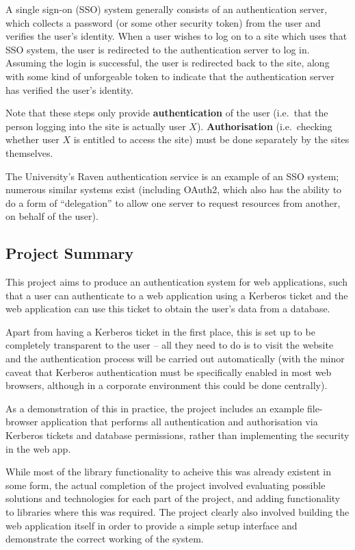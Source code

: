 \documentclass{article}
\begin{document}
A single sign-on (SSO) system generally consists of an authentication server, which collects a password (or some other security token) from the user and verifies the user's identity. When a user wishes to log on to a site which uses that SSO system, the user is redirected to the authentication server to log in. Assuming the login is successful, the user is redirected back to the site, along with some kind of unforgeable token to indicate that the authentication server has verified the user's identity.

Note that these steps only provide \textbf{authentication} of the user (i.e.\ that the person logging into the site is actually user $X$). \textbf{Authorisation} (i.e.\ checking whether user $X$ is entitled to access the site) must be done separately by the sites themselves.

The University's Raven authentication service is an example of an SSO system; numerous similar systems exist (including OAuth2, which also has the ability to do a form of ``delegation'' to allow one server to request resources from another, on behalf of the user\cite{Oracle-OAuth2}).

\subsection{Project Summary}
This project aims to produce an authentication system for web applications, such that a user can authenticate to a web application using a Kerberos ticket and the web application can use this ticket to obtain the user's data from a database.

Apart from having a Kerberos ticket in the first place, this is set up to be completely transparent to the user -- all they need to do is to visit the website and the authentication process will be carried out automatically (with the minor caveat that Kerberos authentication must be specifically enabled in most web browsers, although in a corporate environment this could be done centrally).

As a demonstration of this in practice, the project includes an example file-browser application that performs all authentication and authorisation via Kerberos tickets and database permissions, rather than implementing the security in the web app.

While most of the library functionality to acheive this was already existent in some form, the actual completion of the project involved evaluating possible solutions and technologies for each part of the project, and adding functionality to libraries where this was required. The project clearly also involved building the web application itself in order to provide a simple setup interface and demonstrate the correct working of the system.
\end{document}
